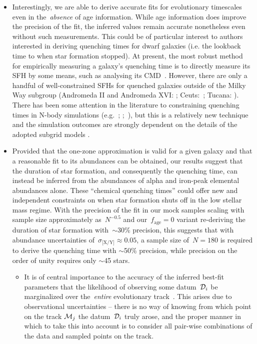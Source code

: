 \documentclass[ms.tex]{subfiles}
\begin{document}
\begin{itemize}
	\item Interestingly, we are able to derive accurate fits for evolutionary
	timescales even in the~\textit{absence} of age information.
	While age information does improve the precision of the fit, the inferred
	values remain accurate nonetheless even without such measurements.
	This could be of particular interest to authors interested in deriving
	quenching times for dwarf galaxies (i.e. the lookback time to when star
	formation stopped).
	At present, the most robust method for empirically measuring a galaxy's
	quenching time is to directly measure its SFH by some means, such as analysing its CMD~\citep[e.g.][]{Sohn2013, Weisz2015}.
	However, there are only a handful of well-constrained SFHs for quenched
	galaxies outside of the Milky Way subgroup (Andromeda II and Andromeda XVI:
	\citealp{Weisz2014a}; Ceuts:~\citealp{Monelli2010a}; Tucana:
	\citealp{Monelli2010b}).
	There has been some attention in the literature to constraining quenching
	times in N-body simulations (e.g.~\citealp{Phillips2014, Phillips2015};
	\citealp*{Rocha2012};~\citealp{Slater2013, Slater2014, Wheeler2014}), but
	this is a relatively new technique and the simulation outcomes are strongly
	dependent on the details of the adopted subgrid models
	\citep[see discussion in, e.g.,][]{Li2020}.

	\item Provided that the one-zone approximation is valid for a given galaxy
	and that a reasonable fit to its abundances can be obtained, our results
	suggest that the duration of star formation, and consequently the quenching
	time, can instead be inferred from the abundances of alpha and iron-peak
	elemental abundances alone.
	These ``chemical quenching times'' could offer new and independent
	constraints on when star formation shuts off in the low stellar mass
	regime.
	With the precision of the fit in our mock samples scaling with sample size
	approximately as~$N^{-0.5}$ and our~$f_\text{age} = 0$ variant re-deriving
	the duration of star formation with~$\sim$30\% precision, this suggests
	that with abundance uncertainties of~$\sigma_\text{[X/Y]} \approx 0.05$,
	a sample size of~$N = 180$ is required to derive the quenching time with
	$\sim$50\% precision, while precision on the order of unity requires only
	$\sim$45 stars.

	\begin{itemize}
		\item It is of central importance to the accuracy of the inferred
		best-fit parameters that the likelihood of observing some
		datum~$\mathcal{D}_i$ be marginalized over the~\textit{entire}
		evolutionary track~.
		This arises due to observational uncertainties -- there is no way of
		knowing from which point on the track $\mathcal{M}_j$ the
		datum~$\mathcal{D}_i$ truly arose, and the proper manner in which to
		take this into account is to consider all pair-wise combinations of the
		data and sampled points on the track.
		

\end{itemize}
\end{itemize}
\end{document}
